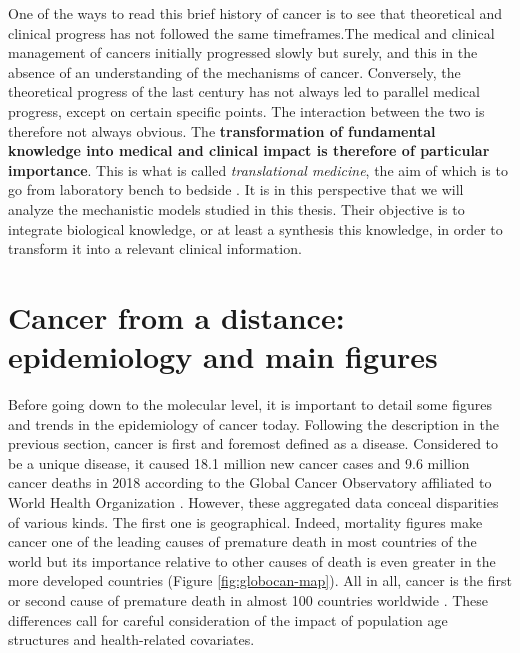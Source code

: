 \documentclass[a4paper,12pt,twoside,onecolumn,openright,final,oldfontcommands]{memoir}
\begin{document}
One of the ways to read this brief history of cancer is to see that
theoretical and clinical progress has not followed the same
timeframes.The medical and clinical management of cancers initially
progressed slowly but surely, and this in the absence of an
understanding of the mechanisms of cancer. Conversely, the theoretical
progress of the last century has not always led to parallel medical
progress, except on certain specific points. The interaction between the
two is therefore not always obvious. The \textbf{transformation of
fundamental knowledge into medical and clinical impact is therefore of
particular importance}. This is what is called \emph{translational
medicine}, the aim of which is to go from laboratory bench to bedside
\citep{cohrs2015translational}. It is in this perspective that we will
analyze the mechanistic models studied in this thesis. Their objective
is to integrate biological knowledge, or at least a synthesis this
knowledge, in order to transform it into a relevant clinical
information.

\section{Cancer from a distance: epidemiology and main
figures}\label{epidemio}

Before going down to the molecular level, it is important to detail some
figures and trends in the epidemiology of cancer today. Following the
description in the previous section, cancer is first and foremost
defined as a disease. Considered to be a unique disease, it caused 18.1
million new cancer cases and 9.6 million cancer deaths in 2018 according
to the Global Cancer Observatory affiliated to World Health Organization
\citep{bray2018global}. However, these aggregated data conceal
disparities of various kinds. The first one is geographical. Indeed,
mortality figures make cancer one of the leading causes of premature
death in most countries of the world but its importance relative to
other causes of death is even greater in the more developed countries
(Figure \ref{fig:globocan-map}). All in all, cancer is the first or
second cause of premature death in almost 100 countries worldwide
\citep{bray2018global}. These differences call for careful consideration
of the impact of population age structures and health-related
covariates.
\end{document}
